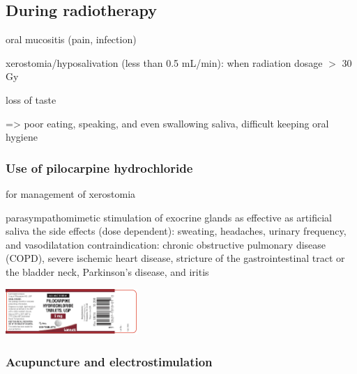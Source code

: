 \documentclass[
paper=landscape,
paper=160mm:90mm, %
fontsize=11pt, %
pagesize, %
parskip=half-, %
]{scrartcl} %
\theoremstyle{mythmstyle} %
\begin{document}
\clearpage
\subsection{During radiotherapy}

 oral mucositis (pain, infection)
 
 xerostomia/hyposalivation (less than 0.5 mL/min): when radiation dosage $>$ 30 Gy

 
 loss of taste
 
 => poor eating, speaking, and even swallowing saliva, difficult keeping oral hygiene
 
\subsubsection{Use of pilocarpine hydrochloride}

 \vspace{0.3cm}
\begin{minipage}[c]{0.45\linewidth}
\begin{outline}

\1 for management of xerostomia

    \2 parasympathomimetic stimulation of exocrine glands
    \2 as effective as artificial saliva
    \2 the side effects (dose dependent): sweating, headaches, urinary frequency, and vasodilatation
\1 contraindication: chronic obstructive pulmonary disease (COPD), severe ischemic heart disease, stricture of the gastrointestinal tract or the bladder neck, Parkinson's disease, and iritis
\end{outline}

\end{minipage}
\begin{minipage}[c]{0.5\linewidth}

\includegraphics[width=5.0cm]{index.png}
\end{minipage}

\clearpage
\subsubsection{Acupuncture and electrostimulation}

\autocite{Ni2020}
\end{document}

